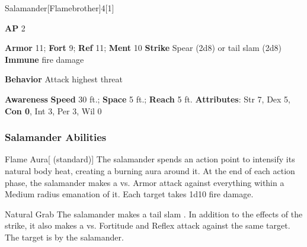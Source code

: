 \begin{monsection}{Salamander}[Flamebrother]{4}[1]
\vspace{-1em}\vspace{-1em}
\begin{spellcontent}
\begin{spelltargetinginfo}
{\textbf{AP} 2}

\pari \textbf{Armor} 11;
\textbf{Fort} 9;
\textbf{Ref} 11;
\textbf{Ment} 10
\pari \textbf{Strike} Spear  (2d8) or tail slam  (2d8)
\pari \textbf{Immune} fire damage


\pari \textbf{Behavior} Attack highest threat
\end{spelltargetinginfo}
\end{spellcontent}

\begin{monsterfooter}
\pari \textbf{Awareness} 
\pari \textbf{Speed} 30 ft.;
\textbf{Space} 5 ft.;
\textbf{Reach} 5 ft.
\pari \textbf{Attributes}:
Str 7,
Dex 5,
\textbf{Con 0},
Int 3,
Per 3,
Wil 0
\end{monsterfooter}
\end{monsection}


\subsubsection{Salamander Abilities}

\begin{ability}{Flame Aura}[ (standard)]
The salamander spends an action point to intensify its natural body heat, creating a burning aura around it.
At the end of each action phase, the salamander makes a  vs. Armor
attack against everything within a Medium radius emanation of it.
\hit Each target takes 1d10 fire damage.
\end{ability}

\vspace{0.5em}
\begin{ability}{Natural Grab}
The salamander makes a tail slam .
In addition to the effects of the strike, it also makes a  vs. Fortitude and Reflex attack against the same target.
\hit The target is  by the salamander.
\end{ability}

